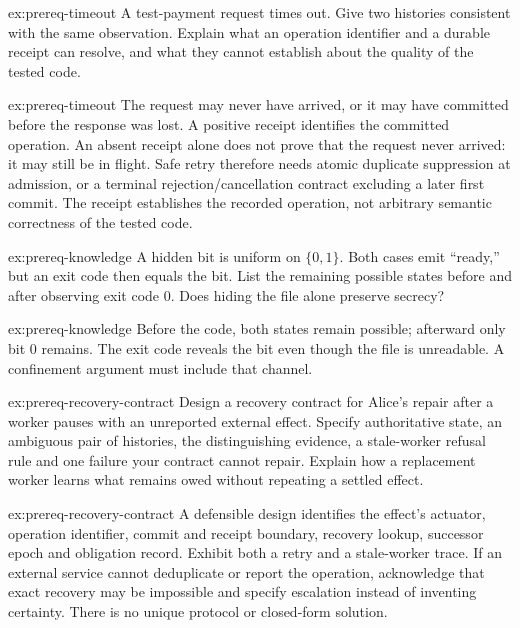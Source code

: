 \begin{pdexercise}[kind=Trace,rating=2]{ex:prereq-timeout}
A test-payment request times out. Give two histories consistent with the same
observation. Explain what an operation identifier and a durable receipt can
resolve, and what they cannot establish about the quality of the tested code.
\end{pdexercise}
\begin{pdsolution}{ex:prereq-timeout}
The request may never have arrived, or it may have committed before the response
was lost. A positive receipt identifies the committed operation. An absent receipt
alone does not prove that the request never arrived: it may still be in flight.
Safe retry therefore needs atomic duplicate suppression at admission, or a
terminal rejection/cancellation contract excluding a later first commit.
The receipt establishes the recorded operation, not arbitrary semantic
correctness of the tested code.
\end{pdsolution}

\begin{pdexercise}[kind=Trace,rating=2]{ex:prereq-knowledge}
A hidden bit is uniform on $\{0,1\}$. Both cases emit ``ready,'' but an exit code
then equals the bit. List the remaining possible states before and after
observing exit code 0. Does hiding the file alone preserve secrecy?
\end{pdexercise}
\begin{pdsolution}{ex:prereq-knowledge}
Before the code, both states remain possible; afterward only bit 0 remains.
The exit code reveals the bit even though the file is unreadable. A confinement
argument must include that channel.
\end{pdsolution}

\begin{pdexercise}[kind=Open,rating=3]{ex:prereq-recovery-contract}
Design a recovery contract for Alice's repair after a worker pauses with an
unreported external effect. Specify authoritative state, an ambiguous pair of
histories, the distinguishing evidence, a stale-worker refusal rule and one
failure your contract cannot repair. Explain how a replacement worker learns
what remains owed without repeating a settled effect.
\end{pdexercise}
\begin{pdsolution}{ex:prereq-recovery-contract}
A defensible design identifies the effect's actuator, operation identifier,
commit and receipt boundary, recovery lookup, successor epoch and obligation
record. Exhibit both a retry and a stale-worker trace. If an external service
cannot deduplicate or report the operation, acknowledge that exact recovery
may be impossible and specify escalation instead of inventing certainty.
There is no unique protocol or closed-form solution.
\end{pdsolution}

